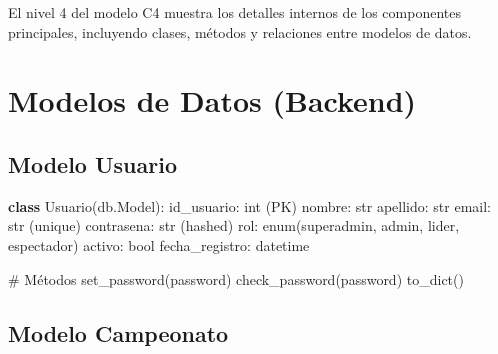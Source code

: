 \documentclass[
  spanish,
  11pt,
  letterpaper,
]{book}
\newenvironment{Shaded}{\begin{snugshade}}{\end{snugshade}}
\newcommand{\BuiltInTok}[1]{\textcolor[rgb]{0.00,0.23,0.31}{#1}}
\newcommand{\CommentTok}[1]{\textcolor[rgb]{0.37,0.37,0.37}{#1}}
\newcommand{\KeywordTok}[1]{\textcolor[rgb]{0.00,0.23,0.31}{\textbf{#1}}}
\newcommand{\NormalTok}[1]{\textcolor[rgb]{0.00,0.23,0.31}{#1}}
\newcommand{\StringTok}[1]{\textcolor[rgb]{0.13,0.47,0.30}{#1}}
\begin{document}
El nivel 4 del modelo C4 muestra los detalles internos de los
componentes principales, incluyendo clases, métodos y relaciones entre
modelos de datos.

\section{Modelos de Datos (Backend)}\label{modelos-de-datos-backend}

\subsection{Modelo Usuario}\label{modelo-usuario}

\begin{Shaded}
\begin{Highlighting}[]
\KeywordTok{class}\NormalTok{ Usuario(db.Model):}
\NormalTok{    id\_usuario: }\BuiltInTok{int}\NormalTok{ (PK)}
\NormalTok{    nombre: }\BuiltInTok{str}
\NormalTok{    apellido: }\BuiltInTok{str}
\NormalTok{    email: }\BuiltInTok{str}\NormalTok{ (unique)}
\NormalTok{    contrasena: }\BuiltInTok{str}\NormalTok{ (hashed)}
\NormalTok{    rol: enum(}\StringTok{\textquotesingle{}superadmin\textquotesingle{}}\NormalTok{, }\StringTok{\textquotesingle{}admin\textquotesingle{}}\NormalTok{, }\StringTok{\textquotesingle{}lider\textquotesingle{}}\NormalTok{, }\StringTok{\textquotesingle{}espectador\textquotesingle{}}\NormalTok{)}
\NormalTok{    activo: }\BuiltInTok{bool}
\NormalTok{    fecha\_registro: datetime}
    
    \CommentTok{\# Métodos}
\NormalTok{    set\_password(password)}
\NormalTok{    check\_password(password)}
\NormalTok{    to\_dict()}
\end{Highlighting}
\end{Shaded}

\subsection{Modelo Campeonato}\label{modelo-campeonato}
\end{document}
